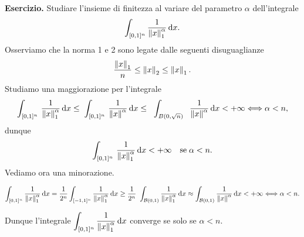 
\textbf{Esercizio.}
Studiare l'insieme di finitezza al variare del parametro $\alpha$ dell'integrale
$$
	\int_{[0,1]^n}^{} \frac{1}{\left\lVert  x  \right\rVert_1^\alpha} \,\mathrm{d} x .
$$
Osserviamo che la norma 1 e 2 sono legate dalle seguenti disuguaglianze
$$
	\frac{\left\lVert  x  \right\rVert_1}{n} \leq \left\lVert  x  \right\rVert_2 \leq \left\lVert  x  \right\rVert_1.
$$
%
Studiamo una maggiorazione per l'integrale
%
$$
	\int_{[0,1]^n}^{} \, \frac{1}{\left\lVert  x  \right\rVert_1^\alpha} \,\mathrm{d} x 
	\leq \;\int_{[0,1]^n}^{} \, \frac{1}{\left\lVert  x  \right\rVert^\alpha} \,\mathrm{d} x 
	\leq \;\;\int_{B(0,\sqrt{n})}^{}\;\; \frac{1}{\left\lVert  x  \right\rVert^\alpha} \,\mathrm{d} x < + \infty \Longleftrightarrow \alpha < n,
$$
%
dunque
%
$$
\int_{[0,1]^n}^{} \, \frac{1}{\left\lVert  x  \right\rVert_1^\alpha} \,\mathrm{d} x < +\infty \quad \text{se} \; \alpha < n.
$$
%
Vediamo ora una minorazione.

$$
	\int_{[0,1]^n}^{} \frac{1}{\left\lVert  x  \right\rVert_1^\alpha} \,\mathrm{d} x 
= \frac{1}{2^n}	\int_{[-1,1]^n}^{} \frac{1}{\left\lVert  x  \right\rVert_1^\alpha} \,\mathrm{d} x 
\geq \frac{1}{2^n} \ \int_{\mathcal{B}(0,1)}^{} \frac{1}{\left\lVert  x  \right\rVert_1^\alpha} \,\mathrm{d} x 
\approx \int_{\mathcal{B}(0,1)}^{} \frac{1}{\left\lVert  x  \right\rVert^\alpha} \,\mathrm{d} x < + \infty 
\Longleftrightarrow \alpha < n.
$$

Dunque l'integrale $\displaystyle \int_{[0,1]^n}^{} \frac{1}{\left\lVert x \right\rVert_1^\alpha} \,\mathrm{d} x$ converge se solo se $\alpha < n$.

